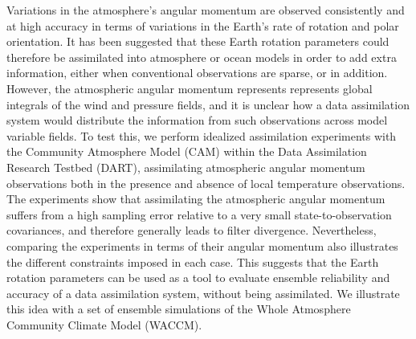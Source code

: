 Variations in the atmosphere's angular momentum are observed consistently and at high accuracy in terms of variations in the Earth's rate of rotation and polar orientation.
It has been suggested that these Earth rotation parameters could therefore be assimilated into atmosphere or ocean models in order to add extra information, either when conventional observations are sparse, or in addition.
%
However, the atmospheric angular momentum represents represents global integrals of the wind and pressure fields, and it is unclear how a data assimilation system would distribute the information from such observations across model variable fields.  
%
To test this, we perform idealized assimilation experiments with the Community Atmosphere Model (CAM) within the Data Assimilation Research Testbed (DART), assimilating atmospheric angular momentum observations both in the presence and absence of local temperature observations. 
The experiments show that
assimilating the atmospheric angular momentum suffers from a high sampling error relative to a very small state-to-observation covariances, and therefore
generally leads to filter divergence.
Nevertheless, comparing the experiments in terms of their angular momentum also illustrates the different constraints imposed in each case. 
This suggests that the Earth rotation parameters can be used as a tool to evaluate ensemble reliability and accuracy of a data assimilation system, without being assimilated. 
We illustrate this idea with a set of ensemble simulations of the Whole Atmosphere Community Climate Model (WACCM).

